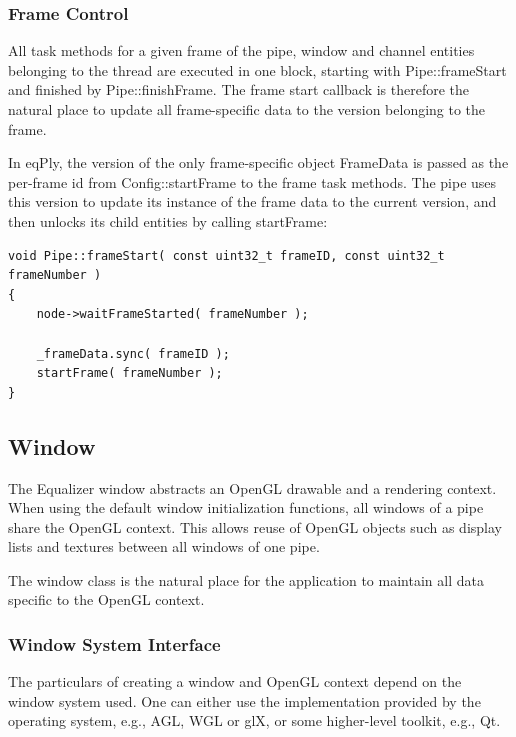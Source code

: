 \documentclass[10pt,a4]{scrartcl}
\begin{document}
\subsubsection{Frame Control}

All task methods for a given frame of the pipe, window and channel
entities belonging to the thread are executed in one block, starting
with \textsf{Pipe::frameStart} and finished by
\textsf{Pipe::finishFrame}. The frame start callback is therefore the
natural place to update all frame-specific data to the version belonging
to the frame. 

In \textsf{eqPly}, the version of the only frame-specific object
\textsf{FrameData} is passed as the per-frame id from
\textsf{Config::startFrame} to the frame task methods. The pipe uses
this version to update its instance of the frame data to the current
version, and then unlocks its child entities by calling
\textsf{startFrame}:

{\footnotesize\begin{lstlisting}
void Pipe::frameStart( const uint32_t frameID, const uint32_t frameNumber )
{
    node->waitFrameStarted( frameNumber );

    _frameData.sync( frameID );
    startFrame( frameNumber );
}
\end{lstlisting}}


\subsection{\label{sEqplyWIndow}Window}

The Equalizer window abstracts an OpenGL drawable and a rendering
context. When using the default window initialization functions, all
windows of a pipe share the OpenGL context. This allows reuse of OpenGL
objects such as display lists and textures between all windows of one
pipe.

The window class is the natural place for the application to maintain
all data specific to the OpenGL context.

\subsubsection{Window System Interface}

The particulars of creating a window and OpenGL context depend on the
window system used. One can either use the implementation provided by
the operating system, e.g., AGL, WGL or glX, or some higher-level
toolkit, e.g., Qt.
\end{document}
